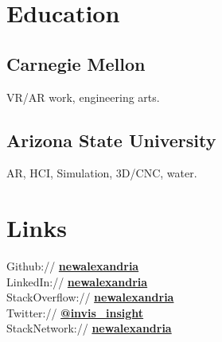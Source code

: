 \documentclass[letterpaper]{deedy-resume} %
\begin{document}
\begin{minipage}[t]{0.33\textwidth} %


\section{Education}


\subsection{Carnegie Mellon}

VR/AR work, engineering arts.

\sectionspace %


\subsection{Arizona State University}
AR, HCI, Simulation, 3D/CNC, water.

\sectionspace %


\section{Links}

Github:// \href{https://github.com/NewAlexandria}{\bf newalexandria} \\
LinkedIn:// \href{https://linkedin.com/in/newalexandria}{\bf newalexandria} \\
StackOverflow:// \href{https://stackoverflow.com/story/newalexandria}{\bf newalexandria} \\
Twitter:// \href{https://twitter.com/invis_insight}{\bf @invis\_insight} \\
StackNetwork:// \href{https://stackexchange.com/users/97237/new-alexandria?tab=accounts}{\bf newalexandria}


\end{minipage}
\end{document}
